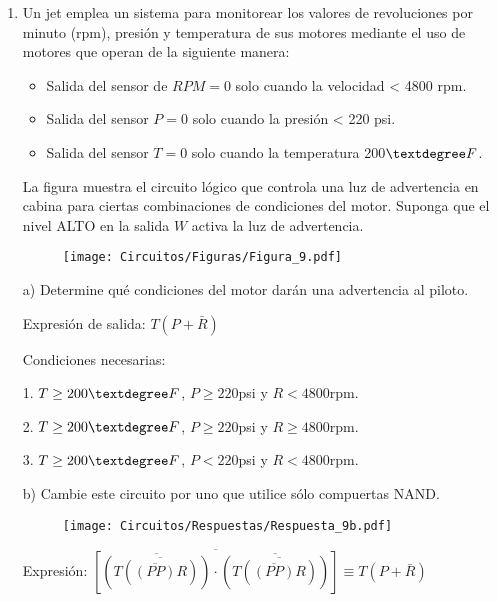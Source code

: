 \documentclass[a4paper, 12pt]{article}
\newcommand{\Aspace}{0.2cm}
\begin{document}
\begin{enumerate}
        
        \newpage
        \item Un jet emplea un sistema para monitorear los valores de revoluciones por minuto (rpm), presión y temperatura de sus motores mediante el uso de motores que operan de la siguiente manera:
        \begin{itemize}
            \item Salida del sensor de $RPM = 0$ solo cuando la velocidad < 4800 rpm.
            \item Salida del sensor $P = 0$ solo cuando la presión < 220 psi.
            \item Salida del sensor $T = 0$ solo cuando la temperatura 200$\textdegree F$.
        \end{itemize}
        La figura muestra el circuito lógico que controla una luz de advertencia en cabina para ciertas combinaciones de condiciones del motor. Suponga que el nivel ALTO en la salida $W$ activa la luz de advertencia.
        \begin{figure}[!ht]
            \centering
            \texttt{[image: Circuitos/Figuras/Figura\_9.pdf]}
        \end{figure}
            \vspace{\Aspace} \par
            a) Determine qué condiciones del motor darán una advertencia al piloto.
            \\ { \color{azul} 
                Expresión de salida: $T(P + \bar{R})$
                \par Condiciones necesarias:
                \par 1. $T \geq 200\textdegree F$, $P \geq 220$psi y $R < 4800$rpm.
                \par 2. $T \geq 200\textdegree F$, $P \geq 220$psi y $R \geq 4800$rpm.
                \par 3. $T \geq 200\textdegree F$, $P < 220$psi y $R < 4800$rpm.
            }

            \vspace{\Aspace} \par
            b) Cambie este circuito por uno que utilice sólo compuertas NAND.
            \\ { \color{azul}
                \begin{figure}[!ht]
                    \centering
                    \texttt{[image: Circuitos/Respuestas/Respuesta\_9b.pdf]}
                \end{figure}
                \par Expresión: $\overline{\left[ \overline{\left(T  \overline{\left(\overline{(P P)} R\right)}\right)} \cdot \overline{\left(T  \overline{\left(\overline{(P P)} R\right)}\right)} \right]} \equiv T(P + \bar{R})$
            }




\end{enumerate}
\end{document}
